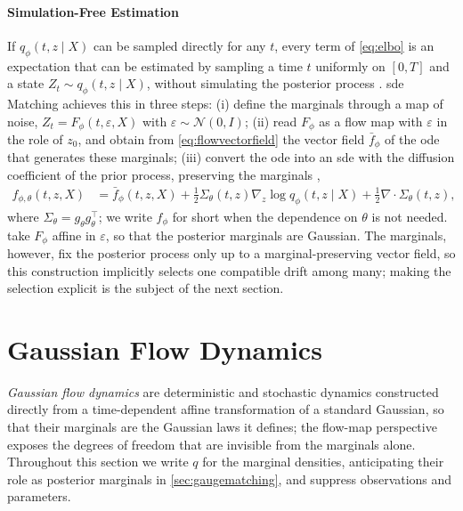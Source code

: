 \documentclass{article} %
\newcommand{\postdrift}{f}
\newcommand{\odedrift}{\bar f}
\newcommand{\vol}{g}
\newcommand{\obs}{X}
\newcommand{\Norm}{\mathcal{N}}
\begin{document}
\paragraph{Simulation-Free Estimation}
If $q_\phi(t, z \mid \obs)$ can be sampled directly for any $t$, every term of \cref{eq:elbo} is an expectation that can be estimated by sampling a time $t$ uniformly on $[0, T]$ and a state $Z_t \sim q_\phi(t, z \mid \obs)$, without simulating the posterior process \citep{course2023amortized,bartosh2025sde}. \gls{sde} Matching \citep{bartosh2025sde} achieves this in three steps: (i) define the marginals through a map of noise, $Z_t = F_\phi(t, \varepsilon, \obs)$ with $\varepsilon \sim \Norm(0, I)$; (ii) read $F_\phi$ as a flow map with $\varepsilon$ in the role of $z_0$, and obtain from \cref{eq:flowvectorfield} the vector field $\odedrift_\phi$ of the \gls{ode} that generates these marginals; (iii) convert the \gls{ode} into an \gls{sde} with the diffusion coefficient of the prior process, preserving the marginals \citep{song2021score},
\begin{align}
    \postdrift_{\phi, \theta}(t, z, \obs) &= \odedrift_\phi(t, z, \obs) + \frac{1}{2} \Sigma_\theta(t, z) \nabla_z \log q_\phi(t, z \mid \obs) + \frac{1}{2} \nabla \cdot \Sigma_\theta(t, z),
    \label{eq:odetosde}
\end{align}
where $\Sigma_\theta = \vol_\theta \vol_\theta^\top$; we write $\postdrift_\phi$ for short when the dependence on $\theta$ is not needed. \citet{bartosh2025sde} take $F_\phi$ affine in $\varepsilon$, so that the posterior marginals are Gaussian. The marginals, however, fix the posterior process only up to a marginal-preserving vector field, so this construction implicitly selects one compatible drift among many; making the selection explicit is the subject of the next section.

\section{Gaussian Flow Dynamics}
\label{sec:gaussianflowdynamics}

\emph{Gaussian flow dynamics} are deterministic and stochastic dynamics constructed directly from a time-dependent affine transformation of a standard Gaussian, so that their marginals are the Gaussian laws it defines; the flow-map perspective exposes the degrees of freedom that are invisible from the marginals alone. Throughout this section we write $q$ for the marginal densities, anticipating their role as posterior marginals in \cref{sec:gaugematching}, and suppress observations and parameters.
\end{document}
